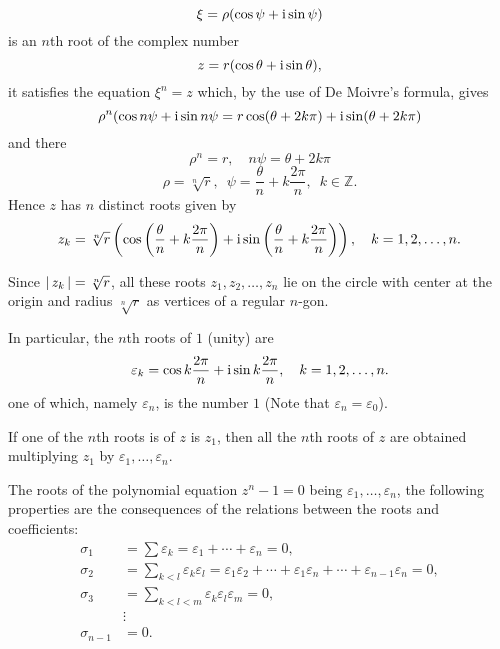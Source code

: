 \documentclass[11pt]{amsbook}
\begin{document}
\[
    \xi = \rho(\cos\psi+ \mathrm{i} \sin\psi)
\]
is an $n$th root of the complex number
\[
    z = r (\cos\theta + \mathrm{i} \sin\theta),
\]
it satisfies the equation $\xi^n = z$ which, 
by the use of De Moivre's formula, 
gives 
\[
    \rho^n (\cos  n \psi + \mathrm{i} \sin n \psi 
    = r \cos ( \theta + 2 k \pi) + \mathrm{i} \sin ( \theta + 2 k \pi)   
\]
and there
\[
	\rho^n = r, 
	\quad  
	n \psi = \theta + 2 k \pi
\]
\[
	\rho = \sqrt [n] {r},
	\enspace 
	\psi = \frac{\theta}{n} + k \frac{2 \pi}{n} ,
	\enspace 
	k \in  \mathbb{Z}.
\]
Hence $z$ has $n$ distinct roots given by
\[
	z_{k} = \sqrt[n]{r} 
	\left( 
		\cos \left( \frac{\theta}{n} + k \frac{2 \pi}{n} \right)
		+ \mathrm{i} \sin \left( \frac{\theta}{n} +k \frac{2 \pi}{n} \right) 
	\right) , 
	\quad
	k = 1, 2, \dotsc, n.
\]

Since $\left \lvert \, z_{k} \, \right \rvert = \sqrt[n]{r}$, 
all these roots $z_{1}, z_{2}, \dotsc, z_{n}$ lie on the circle 
with center at the origin and radius  $\sqrt[n]{r}$  
as vertices of a regular $n$-gon.

In particular, the $n$th roots of $1$ (unity) are 
\[
    \varepsilon_{k} = \cos k \frac{2 \pi}{n}
    	+ \mathrm{i} \sin k \frac{2 \pi}{n},
	\quad
	k = 1, 2, \dotsc, n.
\]
one of which, 
namely $\varepsilon_{n}$,  
is the number $1$ 
(Note that  $\varepsilon_{n} = \varepsilon_{0}$).

If one of the $n$th roots is of $z$ is $z_{1}$, 
then all the $n$th roots of $z$ are obtained multiplying $z_{1}$ by $\varepsilon_{1}, \dotsc, \varepsilon_{n}$.

The roots of the polynomial equation $z^n - 1 = 0$ being
$\varepsilon_{1} , \dots , \varepsilon_{n}$, 
the following properties are the consequences of the relations 
between the roots and coefficients:
\begin{align*}
	\sigma_{1} 
		&= \sum \varepsilon_{k}
		= \varepsilon_{1} + \dotsb +\varepsilon_{n}
		= 0,\\
	\sigma_{2} 
		&= \sum_{k < l} \varepsilon_{k} \varepsilon_{l}
		= \varepsilon_{1} \varepsilon_{2} 
			+ \dotsb 
			+ \varepsilon_{1} \varepsilon_{n} 
			+ \dotsb
			+ \varepsilon_{n-1} \varepsilon_{n}
		= 0,\\
    \sigma_{3} 
		&= \sum_{k < l <m} \varepsilon_{k}\varepsilon_{l}\varepsilon_{m} 
		= 0,\\
		&\vdots\\
	\sigma_{n-1}
		&= 0.
\end{align*}
\end{document}
